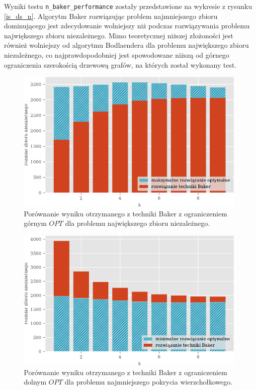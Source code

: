 \documentclass[twoside,a4paper,12pt]{report} %
\theoremstyle{break}
\begin{document}
Wyniki testu \texttt{n\_baker\_performance} zostały przedstawione na wykresie z rysunku \ref{is_ds_n}. Algorytm Baker rozwiązując problem najmniejszego zbioru dominującego jest zdecydowanie wolniejszy niż podczas rozwiązywania problemu największego zbioru niezależnego. Mimo teoretycznej niższej złożoności jest również wolniejszy od algorytmu Bodlaendera dla problemu największego zbioru niezależnego, co najprawdopodobniej jest spowodowane niższą od górnego ograniczenia szerokością drzewową grafów, na których został wykonany test.

\begin{figure}[h!]
    \centering
    \includegraphics{wykresy/is_ptas_res.pdf}
    \caption{Porównanie wyniku otrzymanego z techniki Baker z ograniczeniem górnym $OPT$ dla problemu największego zbioru niezależnego.}
    \label{is_ptas_res}
\end{figure}

\begin{figure}[h!]
    \centering
    \includegraphics{wykresy/vc_ptas_res.pdf}
    \caption{Porównanie wyniku otrzymanego z techniki Baker z ograniczeniem dolnym $OPT$ dla problemu najmniejszego pokrycia wierzchołkowego.}
    \label{vc_ptas_res}
\end{figure}
\end{document}

